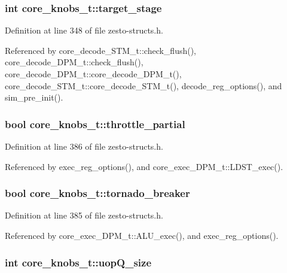 \subsubsection[{target\_\-stage}]{\setlength{\rightskip}{0pt plus 5cm}int {\bf core\_\-knobs\_\-t::target\_\-stage}}\label{structcore__knobs__t_35e7cbfcedd8d200ba4f922edd980927}




Definition at line 348 of file zesto-structs.h.

Referenced by core\_\-decode\_\-STM\_\-t::check\_\-flush(), core\_\-decode\_\-DPM\_\-t::check\_\-flush(), core\_\-decode\_\-DPM\_\-t::core\_\-decode\_\-DPM\_\-t(), core\_\-decode\_\-STM\_\-t::core\_\-decode\_\-STM\_\-t(), decode\_\-reg\_\-options(), and sim\_\-pre\_\-init().
\subsubsection[{throttle\_\-partial}]{\setlength{\rightskip}{0pt plus 5cm}bool {\bf core\_\-knobs\_\-t::throttle\_\-partial}}\label{structcore__knobs__t_8727de6473bf8cbad910c7c11ff2a17d}




Definition at line 386 of file zesto-structs.h.

Referenced by exec\_\-reg\_\-options(), and core\_\-exec\_\-DPM\_\-t::LDST\_\-exec().
\subsubsection[{tornado\_\-breaker}]{\setlength{\rightskip}{0pt plus 5cm}bool {\bf core\_\-knobs\_\-t::tornado\_\-breaker}}\label{structcore__knobs__t_c39e6bf4d52146fb3a9bcef5434626d8}




Definition at line 385 of file zesto-structs.h.

Referenced by core\_\-exec\_\-DPM\_\-t::ALU\_\-exec(), and exec\_\-reg\_\-options().
\subsubsection[{uopQ\_\-size}]{\setlength{\rightskip}{0pt plus 5cm}int {\bf core\_\-knobs\_\-t::uopQ\_\-size}}\label{structcore__knobs__t_afce6ee11bf69be92bb7e2f779f58981}




